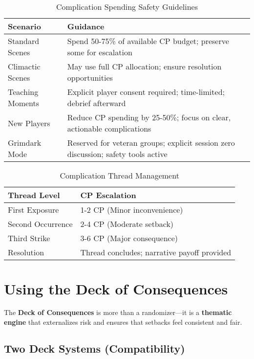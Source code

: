 \begin{table}[htbp]
\centering
\caption{Complication Spending Safety Guidelines}
\begin{tabular}{|p{3.5cm}|p{5.5cm}|}
\hline
\textbf{Scenario} & \textbf{Guidance} \\
\hline
Standard Scenes & Spend 50-75\% of available CP budget; preserve some for escalation \\
Climactic Scenes & May use full CP allocation; ensure resolution opportunities \\
Teaching Moments & Explicit player consent required; time-limited; debrief afterward \\
New Players & Reduce CP spending by 25-50\%; focus on clear, actionable complications \\
Grimdark Mode & Reserved for veteran groups; explicit session zero discussion; safety tools active \\
\hline
\end{tabular}
\end{table}

\begin{table}[htbp]
\centering
\caption{Complication Thread Management}
\begin{tabular}{|p{3cm}|p{6cm}|}
\hline
\textbf{Thread Level} & \textbf{CP Escalation} \\
\hline
First Exposure & 1-2 CP (Minor inconvenience) \\
Second Occurrence & 2-4 CP (Moderate setback) \\
Third Strike & 3-6 CP (Major consequence) \\
Resolution & Thread concludes; narrative payoff provided \\
\hline
\end{tabular}
\end{table}

\section*{Using the Deck of Consequences}

The \textbf{Deck of Consequences} is more than a randomizer---it is a \textbf{thematic engine} that externalizes risk and ensures that setbacks feel consistent and fair.

\subsection*{Two Deck Systems (Compatibility)}

